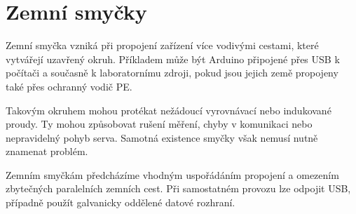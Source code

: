 \section{Zemní smyčky}

Zemní smyčka vzniká při propojení zařízení více vodivými cestami, které vytvářejí uzavřený okruh. Příkladem může být Arduino připojené přes USB k počítači a současně k laboratornímu zdroji, pokud jsou jejich země propojeny také přes ochranný vodič PE.~\cite{osak}

Takovým okruhem mohou protékat nežádoucí vyrovnávací nebo indukované proudy. Ty mohou způsobovat rušení měření, chyby v komunikaci nebo nepravidelný pohyb serva. Samotná existence smyčky však nemusí nutně znamenat problém.

\vspace{5mm}

\noindent\begin{minipage}{\textwidth}\centering
\resizebox{.90\textwidth}{!}{}
\captionsetup{hypcap=false}
\end{minipage}\medskip

Zemním smyčkám předcházíme vhodným uspořádáním propojení a omezením zbytečných paralelních zemních cest. Při samostatném provozu lze odpojit USB, případně použít galvanicky oddělené datové rozhraní.
